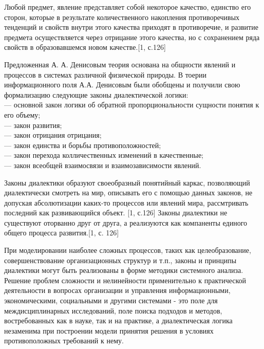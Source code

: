 \documentclass[a4paper,12pt]{report}
\begin{document}
Любой предмет, явление представляет собой некоторое качество, единство его сторон, которые в результате количественного накопления противоречивых тенденций и свойств внутри этого качества приходят в противоречие, и развитие предмета осуществляется через отрицание этого качества, но с сохранением ряда свойств в образовавшемся новом качестве.[1, с.126]

Предложенная А. А. Денисовым теория основана на общности явлений и процессов в системах различной физической природы. В тоерии информационного поля А.А. Денисовым были обобщены и получили свою формализацию следующие законы диалектической логики:\\
\hspace*{0.7cm}—  основной закон логики об обратной пропорциональности сущности понятия к его объему;\\
\hspace*{0.7cm}—  закон развития;\\
\hspace*{0.7cm}—  закон отрицания отрицания;\\
\hspace*{0.7cm}—  закон единства и борьбы противоположностей;\\
\hspace*{0.7cm}—  закон перехода колличественных изменений в качественные;\\
\hspace*{0.7cm}—  закон всеобщей взаимосвязи и взаимозависимости явлений.

Законы диалектики образуют своеобразный понятийный каркас, позволяющий диалектически смотреть на мир, описывать его с помощью данных законов, не допуская абсолютизации каких-то процессов или явлений мира, рассмтривать последний как развивающийся объект. [1, с.126] Законы диалектики не существуют оторванно  друг от друга, а реализуются как компаненты единого общего процесса развития.[1, с. 126]

При моделировании наиболее сложных процессов, таких как целеобразование, совершенствование организационных структур и т.п., законы и принципы диалектики могут быть реализованы в форме методики системного анализа. 
Решение проблем сложности и нелинейности применительно к практической деятельности в вопросах организации и управления информационными, экономическими, социальными и другими системами - это поле для междисциплинарных исследований, поле поиска подходов и методов, востребованных как в науке, так и на практике, а диалектическая логика незаменима при построении модели принятия решения в условиях противоположных требований к нему.
\end{document}

